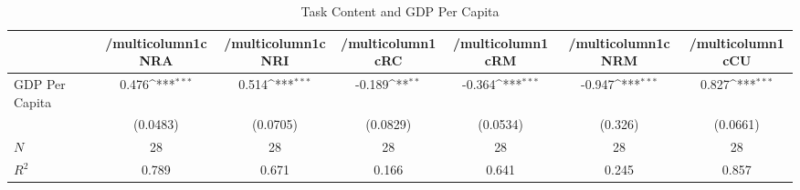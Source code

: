 \begin{table}[htbp]\centering
\def\sym#1{\ifmmode^{#1}\else\(^{#1}\)\fi}
\caption{Task Content and GDP Per Capita}
\begin{tabular}{l*{6}{c}}
\hline\hline
            &/multicolumn{1}{c}{NRA}&/multicolumn{1}{c}{NRI}&/multicolumn{1}{c}{RC}&/multicolumn{1}{c}{RM}&/multicolumn{1}{c}{NRM}&/multicolumn{1}{c}{CU}\\
\hline
GDP Per Capita&       0.476\sym{***}&       0.514\sym{***}&      -0.189\sym{**} &      -0.364\sym{***}&      -0.947\sym{***}&       0.827\sym{***}\\
            &    (0.0483)         &    (0.0705)         &    (0.0829)         &    (0.0534)         &     (0.326)         &    (0.0661)         \\
\hline
\(N\)       &          28         &          28         &          28         &          28         &          28         &          28         \\
\(R^{2}\)   &       0.789         &       0.671         &       0.166         &       0.641         &       0.245         &       0.857         \\
\hline\hline
\end{tabular}
\end{table}
